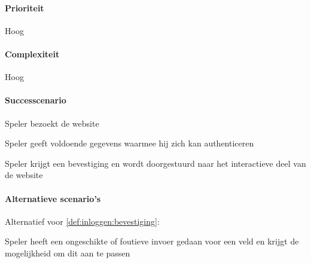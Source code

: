 \begin{compact}
\paragraph{Prioriteit}Hoog
\paragraph{Complexiteit}Hoog
\paragraph{Successcenario}
\begin{enumerate_compact}
 \item Speler bezoekt de website
 \item Speler geeft voldoende gegevens waarmee hij zich kan authenticeren
 \item \label{def:inloggen:bevestiging} Speler krijgt een bevestiging en wordt doorgestuurd naar het interactieve deel van de website
\end{enumerate_compact}
\paragraph{Alternatieve scenario's}
Alternatief voor \ref{def:inloggen:bevestiging}:
\begin{enumerate_compact}
 \item Speler heeft een ongeschikte of foutieve invoer gedaan voor een veld en krijgt de mogelijkheid om dit aan te passen
\end{enumerate_compact}
\end{compact}

